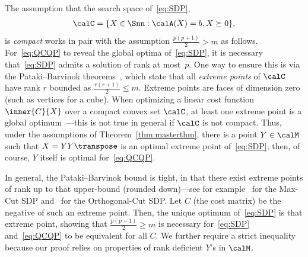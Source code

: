 \documentclass{article}
\newcommand{\1}{\mathbf{1}}
\begin{document}
The assumption that the search space of~\eqref{eq:SDP}, 
\begin{align}
	\calC = \{ X \in \Snn : \calA(X) = b, X \succeq 0 \},
	\label{eq:C}
\end{align}
is \emph{compact} works in pair with the assumption $\frac{p(p+1)}{2} > m$ as follows. For~\eqref{eq:QCQP} to reveal the global optima of~\eqref{eq:SDP}, it is necessary that~\eqref{eq:SDP} admits a solution of rank at most~$p$. One way to ensure this is via the Pataki--Barvinok theorems~\citep{pataki1998rank,barvinok1995problems}, which state that all \emph{extreme points} of $\calC$ have rank $r$ bounded as $\frac{r(r+1)}{2} \leq m$. Extreme points are faces of dimension zero (such as vertices for a cube). When optimizing a linear cost function $\inner{C}{X}$ over a compact convex set $\calC$, at least one extreme point is a global optimum~\cite[Cor.\,32.3.2]{rockafellar1997convex}---this is not true in general if $\calC$ is not compact. Thus, under the assumptions of Theorem~\ref{thm:masterthm}, there is a point $Y\in\calM$ such that $X = YY\transpose$ is an optimal extreme point of~\eqref{eq:SDP}; then, of course, $Y$ itself is optimal for~\eqref{eq:QCQP}.

In general, the Pataki--Barvinok bound is tight, in that there exist extreme points of rank up to that upper-bound (rounded down)---see for example~\citep{laurent1996facial} for the Max-Cut SDP and~\citep{boumal2015staircase} for the Orthogonal-Cut SDP. Let $C$ (the cost matrix) be the negative of such an extreme point. Then, the unique optimum of~\eqref{eq:SDP} is that extreme point, showing that $\frac{p(p+1)}{2} \geq m$ is necessary for~\eqref{eq:SDP} and~\eqref{eq:QCQP} to be equivalent for all $C$. We further require a strict inequality because our proof relies on properties of rank deficient $Y$'s in $\calM$.

\end{document}
